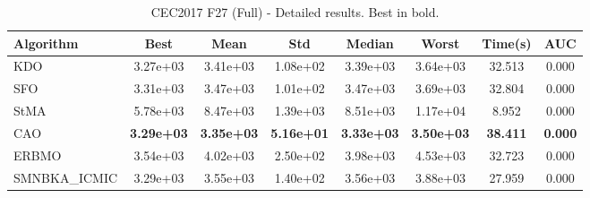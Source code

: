 \begin{table}[H]
\centering\small
\caption{CEC2017 F27 (Full) - Detailed results. Best in bold.}
\label{tab:cec2017_F27}
\begin{tabular}{lccccccc}
\toprule
\textbf{Algorithm} & \textbf{Best} & \textbf{Mean} & \textbf{Std} & \textbf{Median} & \textbf{Worst} & \textbf{Time(s)} & \textbf{AUC} \\
\midrule
KDO & 3.27e+03 & 3.41e+03 & 1.08e+02 & 3.39e+03 & 3.64e+03 & 32.513 & 0.000 \\
SFO & 3.31e+03 & 3.47e+03 & 1.01e+02 & 3.47e+03 & 3.69e+03 & 32.804 & 0.000 \\
StMA & 5.78e+03 & 8.47e+03 & 1.39e+03 & 8.51e+03 & 1.17e+04 & 8.952 & 0.000 \\
CAO & \textbf{3.29e+03} & \textbf{3.35e+03} & \textbf{5.16e+01} & \textbf{3.33e+03} & \textbf{3.50e+03} & \textbf{38.411} & \textbf{0.000} \\
ERBMO & 3.54e+03 & 4.02e+03 & 2.50e+02 & 3.98e+03 & 4.53e+03 & 32.723 & 0.000 \\
SMNBKA_ICMIC & 3.29e+03 & 3.55e+03 & 1.40e+02 & 3.56e+03 & 3.88e+03 & 27.959 & 0.000 \\
\bottomrule
\end{tabular}
\end{table}
